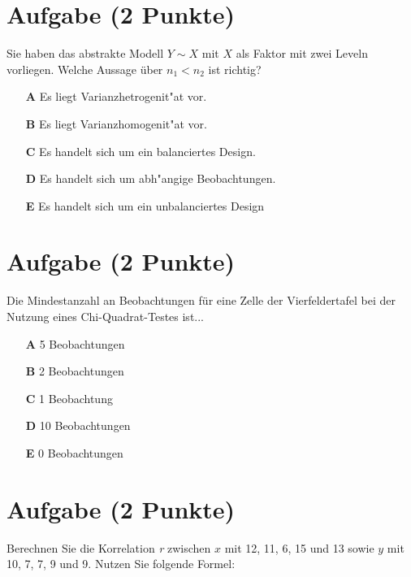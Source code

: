 \documentclass[a4paper, 10pt]{scrartcl}\usepackage[]{graphicx}\usepackage[]{color}
\begin{document}
\section{Aufgabe \hfill (2 Punkte)}




Sie haben das abstrakte Modell $Y \sim X$ mit $X$ als Faktor mit zwei
Leveln vorliegen. Welche Aussage {\"u}ber $n_1 < n_2$ ist richtig?



\begin{enumerate}
\item [\textbf{A} \msquare] Es liegt Varianzhetrogenit{"a}t vor.
\item [\textbf{B} \msquare] Es liegt Varianzhomogenit{"a}t vor.
\item [\textbf{C} \msquare] Es handelt sich um ein balanciertes Design.
\item [\textbf{D} \msquare] Es handelt sich um abh{"a}ngige Beobachtungen.
\item [\textbf{E} \msquare] Es handelt sich um ein unbalanciertes Design
\end{enumerate} 

\section{Aufgabe \hfill (2 Punkte)}

Die Mindestanzahl an Beobachtungen f{\"u}r eine Zelle der Vierfeldertafel bei
der Nutzung eines Chi-Quadrat-Testes ist...



\begin{enumerate}
\item [\textbf{A} \msquare] 5 Beobachtungen
\item [\textbf{B} \msquare] 2 Beobachtungen
\item [\textbf{C} \msquare] 1 Beobachtung
\item [\textbf{D} \msquare] 10 Beobachtungen
\item [\textbf{E} \msquare] 0 Beobachtungen
\end{enumerate} 

\section{Aufgabe \hfill (2 Punkte)}




Berechnen Sie die Korrelation \textit{r} zwischen $x$ mit 12, 11, 6, 15 und 13 sowie $y$ mit 10, 7, 7, 9 und 9.  Nutzen Sie folgende Formel:
\end{document}
